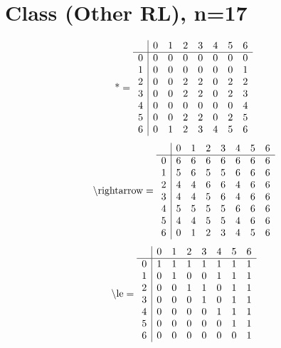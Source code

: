 \documentclass[11pt]{article}
\begin{document}
\section{Class (Other RL), n=17}
\[\text{*} = 
\begin{array}{r | r r r r r r r}
 & 0 & 1 & 2 & 3 & 4 & 5 & 6 \\ \hline
0 & 0 & 0 & 0 & 0 & 0 & 0 & 0 \\
1 & 0 & 0 & 0 & 0 & 0 & 0 & 1 \\
2 & 0 & 0 & 2 & 2 & 0 & 2 & 2 \\
3 & 0 & 0 & 2 & 2 & 0 & 2 & 3 \\
4 & 0 & 0 & 0 & 0 & 0 & 0 & 4 \\
5 & 0 & 0 & 2 & 2 & 0 & 2 & 5 \\
6 & 0 & 1 & 2 & 3 & 4 & 5 & 6 \\
\end{array}
\]
\[\text{\textbackslash rightarrow} = 
\begin{array}{r | r r r r r r r}
 & 0 & 1 & 2 & 3 & 4 & 5 & 6 \\ \hline
0 & 6 & 6 & 6 & 6 & 6 & 6 & 6 \\
1 & 5 & 6 & 5 & 5 & 6 & 6 & 6 \\
2 & 4 & 4 & 6 & 6 & 4 & 6 & 6 \\
3 & 4 & 4 & 5 & 6 & 4 & 6 & 6 \\
4 & 5 & 5 & 5 & 5 & 6 & 6 & 6 \\
5 & 4 & 4 & 5 & 5 & 4 & 6 & 6 \\
6 & 0 & 1 & 2 & 3 & 4 & 5 & 6 \\
\end{array}
\]
\[\text{\textbackslash le} = 
\begin{array}{r | r r r r r r r}
 & 0 & 1 & 2 & 3 & 4 & 5 & 6 \\ \hline
0 & 1 & 1 & 1 & 1 & 1 & 1 & 1 \\
1 & 0 & 1 & 0 & 0 & 1 & 1 & 1 \\
2 & 0 & 0 & 1 & 1 & 0 & 1 & 1 \\
3 & 0 & 0 & 0 & 1 & 0 & 1 & 1 \\
4 & 0 & 0 & 0 & 0 & 1 & 1 & 1 \\
5 & 0 & 0 & 0 & 0 & 0 & 1 & 1 \\
6 & 0 & 0 & 0 & 0 & 0 & 0 & 1 \\
\end{array}
\]
\end{document}
